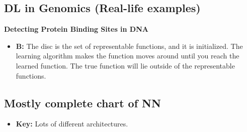 \subsection{DL in Genomics (Real-life examples)}
\begin{example}
    \textbf{Detecting Protein Binding Sites in DNA}
    \begin{itemize}
        \item \textbf{B:} The disc is the set of representable functions, and it is initialized. The learning algorithm makes the function moves around until you reach the learned function. The true function will lie outside of the representable functions. 
    \end{itemize}
\end{example}

\begin{example}
\end{example}

\subsection{Mostly complete chart of NN}
\begin{definition}
    \begin{itemize}
        \item \textbf{Key:} Lots of different architectures.
    \end{itemize}
\end{definition}

